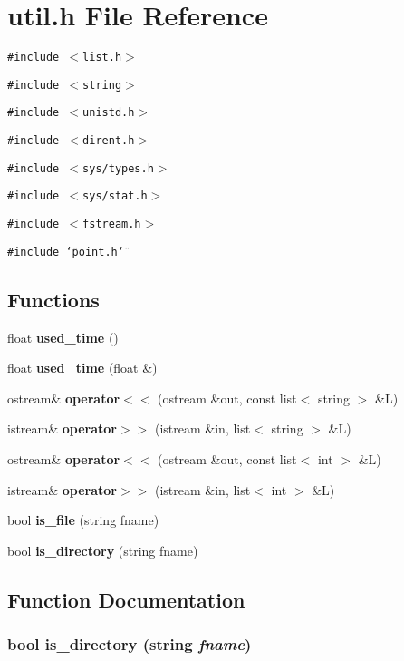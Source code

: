 \section{util.h File Reference}
\label{util_h}
{\tt \#include $<$list.h$>$}\par
{\tt \#include $<$string$>$}\par
{\tt \#include $<$unistd.h$>$}\par
{\tt \#include $<$dirent.h$>$}\par
{\tt \#include $<$sys/types.h$>$}\par
{\tt \#include $<$sys/stat.h$>$}\par
{\tt \#include $<$fstream.h$>$}\par
{\tt \#include \char`\"{}point.h\char`\"{}}\par
\subsection*{Functions}
\begin{CompactItemize}
\item 
float {\bf used\_\-time} ()
\item 
float {\bf used\_\-time} (float \&)
\item 
ostream\& {\bf operator$<$$<$} (ostream \&out, const list$<$ string $>$ \&L)
\item 
istream\& {\bf operator$>$$>$} (istream \&in, list$<$ string $>$ \&L)
\item 
ostream\& {\bf operator$<$$<$} (ostream \&out, const list$<$ int $>$ \&L)
\item 
istream\& {\bf operator$>$$>$} (istream \&in, list$<$ int $>$ \&L)
\item 
bool {\bf is\_\-file} (string fname)
\item 
bool {\bf is\_\-directory} (string fname)
\end{CompactItemize}


\subsection{Function Documentation}
\subsubsection{\setlength{\rightskip}{0pt plus 5cm}bool is\_\-directory (string {\em fname})}\label{util_h_a7}


